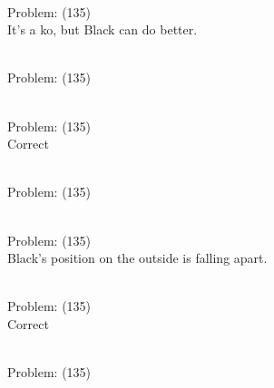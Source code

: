 \documentclass[11pt]{article}
\begin{document}
\begin{minipage}[t]{0.5\textwidth}
  {\centering
  
\\
Problem: (135)\\
It's a ko, but Black can do better.\\
  }
\end{minipage}
\begin{minipage}[t]{0.5\textwidth}
  {\centering
  
\\
Problem: (135)\\
  }
\end{minipage}
\begin{minipage}[t]{0.5\textwidth}
  {\centering
  
\\
Problem: (135)\\
Correct\\
  }
\end{minipage}
\begin{minipage}[t]{0.5\textwidth}
  {\centering
  
\\
Problem: (135)\\
  }
\end{minipage}
\begin{minipage}[t]{0.5\textwidth}
  {\centering
  
\\
Problem: (135)\\
Black's position on the outside is falling apart.\\
  }
\end{minipage}
\begin{minipage}[t]{0.5\textwidth}
  {\centering
  
\\
Problem: (135)\\
Correct\\
  }
\end{minipage}
\begin{minipage}[t]{0.5\textwidth}
  {\centering
  
\\
Problem: (135)\\
  }
\end{minipage}
\end{document}
